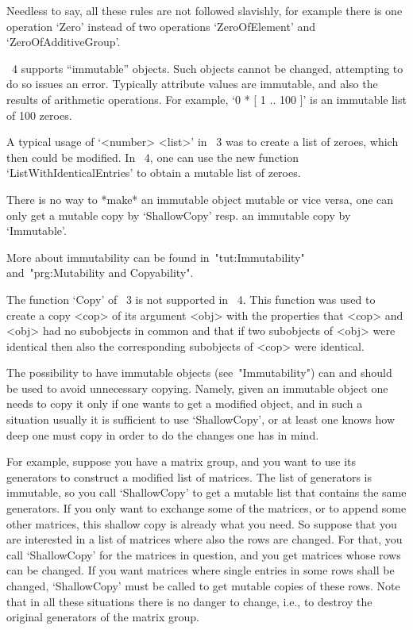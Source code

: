Needless to say, all these rules are not followed slavishly,
for example there is one operation `Zero' instead of two operations
`ZeroOfElement' and `ZeroOfAdditiveGroup'.



{\GAP}~4 supports ``immutable'' objects.
Such objects cannot be changed, attempting to do so issues an error.
Typically attribute values are immutable,
and also the results of arithmetic operations.
For example, `0 * [ 1 .. 100 ]' is an immutable list of 100 zeroes.

A typical usage of `<number> \* <list>' in {\GAP}~3 was to create a list
of zeroes, which then could be modified.
In {\GAP}~4, one can use the new function `ListWithIdenticalEntries' to
obtain a mutable list of zeroes.

There is no way to *make* an immutable object mutable or vice versa,
one can only get a mutable copy by `ShallowCopy' resp. an immutable copy
by `Immutable'.

More about immutability can be found in~"tut:Immutability"
and~"prg:Mutability and Copyability".



The function `Copy' of {\GAP}~3 is not supported in {\GAP}~4.
This function was used to create a copy <cop> of its argument <obj> with
the properties that <cop> and <obj> had no subobjects in common and that
if two subobjects of <obj> were identical then also the corresponding
subobjects of <cop> were identical.

The possibility to have immutable objects (see~"Immutability") can and
should be used to avoid unnecessary copying.
Namely, given an immutable object one needs to copy it only if one wants
to get a modified object, and in such a situation usually it is
sufficient to use `ShallowCopy', or at least one knows how deep one must
copy in order to do the changes one has in mind.

For example, suppose you have a matrix group, and you want to use its
generators to construct a modified list of matrices.
The list of generators is immutable, so you call `ShallowCopy' to get a
mutable list that contains the same generators.
If you only want to exchange some of the matrices, or to append some
other matrices, this shallow copy is already what you need.
So suppose that you are interested in a list of matrices where also
the rows are changed.  For that, you call `ShallowCopy' for the matrices
in question, and you get matrices whose rows can be changed.
If you want matrices where single entries in some rows shall be
changed, `ShallowCopy' must be called to get mutable copies of these
rows.
Note that in all these situations there is no danger to change, i.e.,
to destroy the original generators of the matrix group.

